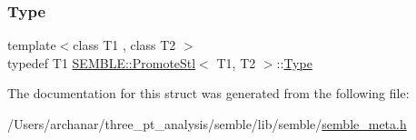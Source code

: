 \subsubsection{\texorpdfstring{Type}{Type}\hspace{0.1cm}{\footnotesize\ttfamily [2/2]}}
{\footnotesize\ttfamily template$<$class T1 , class T2 $>$ \\
typedef T1 \mbox{\hyperlink{structSEMBLE_1_1PromoteStl}{S\+E\+M\+B\+L\+E\+::\+Promote\+Stl}}$<$ T1, T2 $>$\+::\mbox{\hyperlink{structSEMBLE_1_1PromoteStl_a477c81c75d18734d5e76d794d0aba83c}{Type}}}



The documentation for this struct was generated from the following file\+:\begin{DoxyCompactItemize}
\item 
/\+Users/archanar/three\+\_\+pt\+\_\+analysis/semble/lib/semble/\mbox{\hyperlink{lib_2semble_2semble__meta_8h}{semble\+\_\+meta.\+h}}\end{DoxyCompactItemize}
